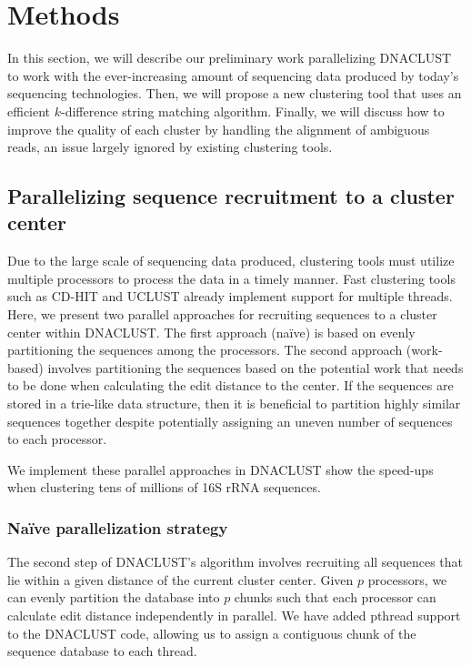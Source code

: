 \section{Methods}

In this section, we will describe our preliminary work parallelizing DNACLUST to work with the ever-increasing amount of sequencing data produced by today's sequencing technologies.
Then, we will propose a new clustering tool that uses an efficient $k$-difference string matching algorithm.
Finally, we will discuss how to improve the quality of each cluster by handling the alignment of ambiguous reads, an issue largely ignored by existing clustering tools.

\subsection{Parallelizing sequence recruitment to a cluster center}

Due to the large scale of sequencing data produced, clustering tools must utilize multiple processors to process the data in a timely manner.  Fast clustering tools such as CD-HIT and UCLUST already implement support for multiple threads.
Here, we present two parallel approaches for recruiting sequences to a cluster center within DNACLUST.
The first approach (na{\"i}ve) is based on evenly partitioning the sequences among the processors.
The second approach (work-based) involves partitioning the sequences based on the potential work that needs to be done when calculating the edit distance to the center.
If the sequences are stored in a trie-like data structure, then it is beneficial to partition highly similar sequences together despite potentially assigning an uneven number of sequences to each processor.

We implement these parallel approaches in DNACLUST\cite{ghodsi_dnaclust:_2011} show the speed-ups when clustering tens of millions of 16S rRNA sequences.

\subsubsection{Na{\"i}ve parallelization strategy}

The second step of DNACLUST's algorithm involves recruiting all sequences that lie within a given distance of the current cluster center.
Given $p$ processors, we can evenly partition the database into $p$ chunks such that each processor can calculate edit distance independently in parallel.
We have added pthread support to the DNACLUST code, allowing us to assign a contiguous chunk of the sequence database to each thread.

